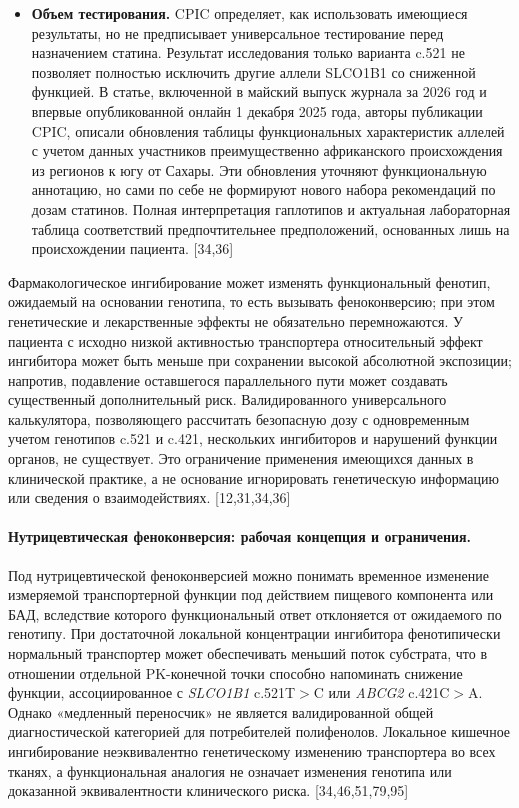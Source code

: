 \documentclass[11pt]{article}
\begin{document}
\begin{itemize}
\item \textbf{Объем тестирования.} CPIC определяет, как использовать имеющиеся результаты, но не предписывает универсальное тестирование перед назначением статина. Результат исследования только варианта c.521 не позволяет полностью исключить другие аллели SLCO1B1 со сниженной функцией. В статье, включенной в майский выпуск журнала за 2026 год и впервые опубликованной онлайн 1 декабря 2025 года, авторы публикации CPIC, описали обновления таблицы функциональных характеристик аллелей с учетом данных участников преимущественно африканского происхождения из регионов к югу от Сахары. Эти обновления уточняют функциональную аннотацию, но сами по себе не формируют нового набора рекомендаций по дозам статинов. Полная интерпретация гаплотипов и актуальная лабораторная таблица соответствий предпочтительнее предположений, основанных лишь на происхождении пациента. [34,36]
\end{itemize}

Фармакологическое ингибирование может изменять функциональный фенотип, ожидаемый на основании генотипа, то есть вызывать феноконверсию; при этом генетические и лекарственные эффекты не обязательно перемножаются. У пациента с исходно низкой активностью транспортера относительный эффект ингибитора может быть меньше при сохранении высокой абсолютной экспозиции; напротив, подавление оставшегося параллельного пути может создавать существенный дополнительный риск. Валидированного универсального калькулятора, позволяющего рассчитать безопасную дозу с одновременным учетом генотипов c.521 и c.421, нескольких ингибиторов и нарушений функции органов, не существует. Это ограничение применения имеющихся данных в клинической практике, а не основание игнорировать генетическую информацию или сведения о взаимодействиях. [12,31,34,36]

\paragraph{Нутрицевтическая феноконверсия: рабочая концепция и ограничения.}
Под нутрицевтической феноконверсией можно понимать временное изменение измеряемой транспортерной функции под действием пищевого компонента или БАД, вследствие которого функциональный ответ отклоняется от ожидаемого по генотипу. При достаточной локальной концентрации ингибитора фенотипически нормальный транспортер может обеспечивать меньший поток субстрата, что в отношении отдельной PK-конечной точки способно напоминать снижение функции, ассоциированное с \textit{SLCO1B1} c.521T\(>\)C или \textit{ABCG2} c.421C\(>\)A. Однако «медленный переносчик» не является валидированной общей диагностической категорией для потребителей полифенолов. Локальное кишечное ингибирование неэквивалентно генетическому изменению транспортера во всех тканях, а функциональная аналогия не означает изменения генотипа или доказанной эквивалентности клинического риска. [34,46,51,79,95]
\end{document}
